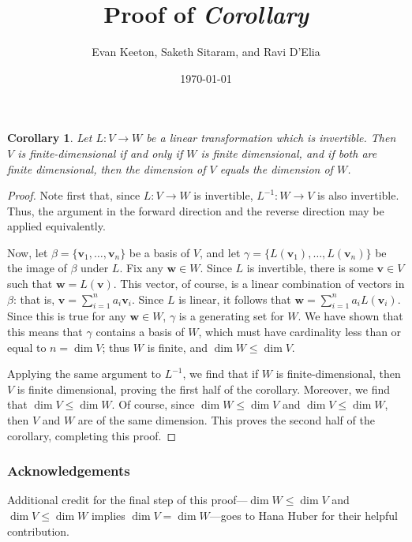 \documentclass{article}
\title{Proof of \emph{Corollary}}
\author{Evan Keeton, Saketh Sitaram, and Ravi D'Elia}
\date{\today}
\renewcommand{\vec}[1]{\mathbf{#1}}
\begin{document}
  \maketitle

  \newtheorem*{crll}{Corollary}

  \begin{crll}
    Let $L: V \to W$ be a linear transformation which is invertible. Then $V$ is finite-dimensional if and only if $W$ is finite dimensional, and if both are finite dimensional, then the dimension of $V$ equals the dimension of $W$.
  \end{crll}

  \begin{proof}
    Note first that, since $L: V \to W$ is invertible, $L^{-1}: W \to V$ is also invertible. Thus, the argument in the forward direction and the reverse direction may be applied equivalently.

    Now, let $\beta = \{\vec{v}_{1},\ldots,\vec{v}_{n}\}$ be a basis of $V$, and let $\gamma = \{L(\vec{v}_{1}),\ldots,L(\vec{v}_{n})\}$ be the image of $\beta$ under $L$. Fix any $\vec{w}\in W$. Since $L$ is invertible, there is some $\vec{v}\in V$ such that $\vec{w} = L(\vec{v})$. This vector, of course, is a linear combination of vectors in $\beta$: that is, $\vec{v} = \sum_{i = 1}^{n} a_{i}\vec{v}_{i}$. Since $L$ is linear, it follows that $\vec{w} = \sum_{i = 1}^{n} a_{i}L(\vec{v}_{i})$. Since this is true for any $\vec{w} \in W$, $\gamma$ is a generating set for $W$. We have shown that this means that $\gamma$ contains a basis of $W$, which must have cardinality less than or equal to $n = \dim V$; thus $W$ is finite, and $\dim W \leq \dim V$.

    Applying the same argument to $L^{-1}$, we find that if $W$ is finite-dimensional, then $V$ is finite dimensional, proving the first half of the corollary. Moreover, we find that $\dim V \leq \dim W$. Of course, since $\dim W \leq \dim V$ and $\dim V \leq \dim W$, then $V$ and $W$ are of the same dimension. This proves the second half of the corollary, completing this proof.
  \end{proof}

  \subsubsection*{Acknowledgements}
    Additional credit for the final step of this proof---$\dim W \leq \dim V$ and $\dim V \leq \dim W$ implies $\dim V = \dim W$---goes to Hana Huber for their helpful contribution.

\end{document}
